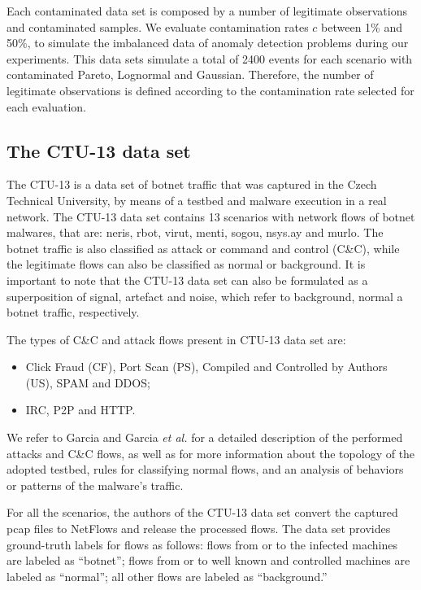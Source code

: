 Each contaminated data set is composed by a number of legitimate observations and contaminated samples. We evaluate contamination rates $c$ between 1\% and 50\%, to simulate the imbalanced data of anomaly detection problems during our experiments. This data sets simulate a total of 2400 events for each scenario with contaminated Pareto, Lognormal and Gaussian. Therefore, the number of legitimate observations is defined according to the contamination rate selected for each evaluation.


\subsection{The CTU-13 data set}
\label{sec:4_CTU-13}

The CTU-13 \cite{garcia2014empirical} is a data set of botnet traffic that was captured in the Czech Technical University, by means of a testbed and malware execution in a real network. The CTU-13 data set contains 13 scenarios with network flows of botnet malwares, that are: neris, rbot, virut, menti, sogou, nsys.ay and murlo. The botnet traffic is also classified as attack or command and control (C\&C), while the legitimate flows can also be classified as normal or background. It is important to note that the CTU-13 data set can also be formulated as a superposition of signal, artefact and noise, which refer to background, normal a botnet traffic, respectively.

The types of C\&C and attack flows present in CTU-13 data set are:

\begin{itemize}
	\item {} Click Fraud (CF), Port Scan (PS), Compiled and Controlled by Authors (US), SPAM and DDOS;
	\item {} IRC, P2P and HTTP.
\end{itemize}

We refer to Garcia \cite{garcia2014identifying} and Garcia \emph{et al.} \cite{garcia2014empirical} for a detailed description of the performed attacks and C\&C flows, as well as for more information about the topology of the adopted testbed, rules for classifying normal flows, and an analysis of behaviors or patterns of the malware's traffic.

For all the scenarios, the authors of the CTU-13 data set convert the captured pcap files to NetFlows and release the processed flows. The data set provides ground-truth labels for flows as follows: flows from or to the infected machines are labeled as “botnet”; flows from or to well known and controlled machines are labeled as “normal”; all other flows are labeled as “background.”

